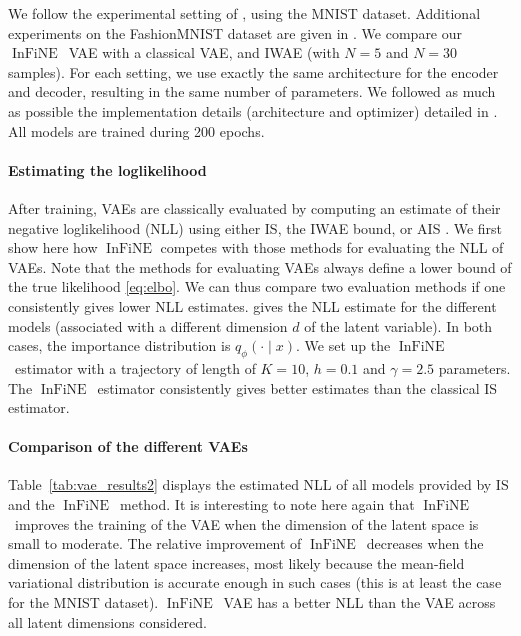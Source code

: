 \documentclass{article}
\def\IFIS{\ensuremath{\operatorname{InFiNE}}}
\def\InFiNE{{\small \IFIS}}
\newcommand{\1}{\mathds{1}}
\begin{document}
We follow the experimental setting of \cite{burda:grosse:2015}, using the MNIST dataset. Additional experiments on the FashionMNIST dataset are given in . We compare our \IFIS\ VAE with a classical VAE, and IWAE (with $N=5$ and $N=30$ samples).
For each setting, we use exactly the same architecture for the encoder and decoder, resulting in the same number of parameters. We followed as much as possible the implementation details (architecture and optimizer) detailed in \cite{burda:grosse:2015}. All models are trained during 200 epochs.


\paragraph{Estimating the loglikelihood}
After training, VAEs are classically evaluated by computing an estimate of their negative loglikelihood (NLL) using either IS, the IWAE bound, or AIS   \cite{wu:burda:grosse:2016}.
We first show here how $\IFIS$ competes with those methods for evaluating the NLL of VAEs.
Note that the methods for evaluating VAEs always define a lower bound of the true likelihood \eqref{eq:elbo}. We can thus compare two evaluation methods if one consistently gives lower NLL estimates.
 gives the NLL estimate for the different models (associated with a different dimension $d$ of the latent variable). 
In both cases, the importance distribution is  $q_\phi(\cdot\mid x)$.  We set up the \InFiNE\ estimator with a trajectory of length of $K=10$, $h= 0.1$ and $\gamma=2.5$ parameters.
The \InFiNE\ estimator consistently gives better estimates than the classical IS estimator.




\paragraph{Comparison of the different VAEs}
 Table~\ref{tab:vae_results2} displays the estimated NLL of all models provided by IS and the \InFiNE\ method. It is interesting to note here again that \InFiNE\ improves the training of the VAE when the dimension of the latent space is small to moderate. The relative improvement of \InFiNE\ decreases when the dimension of the latent space increases, most likely because the mean-field variational distribution is accurate enough in such cases  (this is at least the case for the MNIST dataset).
\InFiNE\ VAE has a better NLL than the VAE across all latent dimensions considered. 
\end{document}
